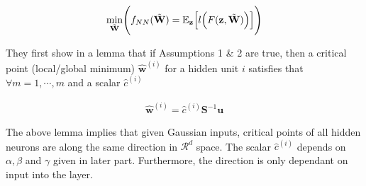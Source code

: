 \documentclass{article}
\begin{document}
\begin{align*}
\underset{\Tilde{\textbf{W}}}{\min}\Bigg(f_{NN}(\Tilde{\textbf{W}})=\mathbb{E}_{\textbf{z}}\Big[l\Big(F(\textbf{z},\Tilde{\textbf{W}})\Big)\Big]\Bigg)
\end{align*}


They first show in a lemma that if Assumptions 1 \& 2 are true, then a critical point (local/global minimum) $\hat{\textbf{w}}^{(i)}$ for a hidden unit $i$ satisfies that $\forall m=1,\cdots,m$ and a scalar $\hat{c}^{(i)}$

\begin{align*}
    \hat{\textbf{w}}^{(i)}=\hat{c}^{(i)}\textbf{S}^{-1}\textbf{u} 
\end{align*}

The above lemma implies that given Gaussian inputs, critical points of all hidden neurons are along the same direction in $\mathcal{R}^d$ space. The scalar $\hat{c}^{(i)}$ depends on $\alpha, \beta$ and $\gamma$ given in later part. Furthermore, the direction is only dependant on input into the layer. 
\end{document}
